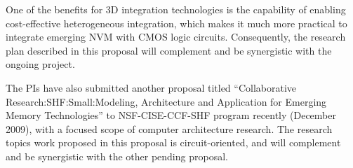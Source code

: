 One of the benefits for 3D integration technologies is
the capability of enabling cost-effective heterogeneous integration, which
makes it much more practical to integrate emerging NVM with CMOS logic circuits.
Consequently, the research plan described in this proposal will
complement and be synergistic with the ongoing project.

The PIs have also submitted another proposal titled ``Collaborative Research:SHF:Small:Modeling, Architecture and Application for Emerging Memory Technologies'' to NSF-CISE-CCF-SHF program recently (December 2009), with a focused
scope of computer architecture research. The research topics work proposed in this proposal is circuit-oriented, and will complement and be synergistic with the other
pending proposal.


